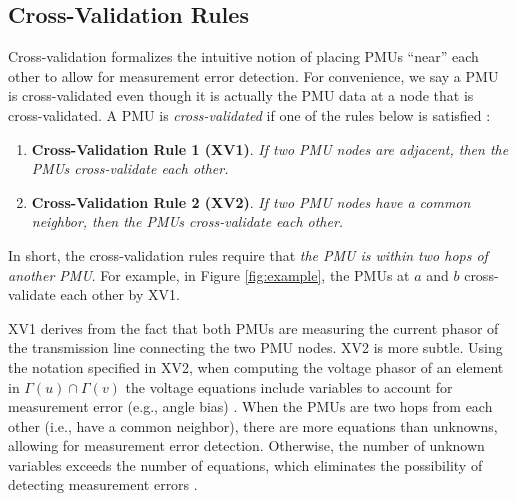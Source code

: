 \subsection{Cross-Validation Rules}
\label{subsec:xval-rules}

Cross-validation formalizes the intuitive notion of placing PMUs ``near'' each other to allow for measurement error detection. 
For convenience, we say a PMU is cross-validated even though it is actually the PMU data at a node that is cross-validated.
A PMU is \emph{cross-validated} if one of the rules below is satisfied \cite{Vanfretti10}: 
\begin{enumerate}
	
	\item {\bf Cross-Validation Rule 1 (XV1)}.  {\it If two PMU nodes are adjacent, then the PMUs cross-validate each other. }

	\item {\bf Cross-Validation Rule 2 (XV2)}. {\it If two PMU nodes have a common neighbor, then the PMUs cross-validate each other.}
\end{enumerate}
In short, the cross-validation rules require that {\em the PMU is within two hops of another PMU}.
For example, in Figure \ref{fig:example}, the PMUs at $a$ and $b$ cross-validate each other by XV1.

XV1 derives from the fact that both PMUs are measuring the current phasor of the transmission line connecting the two PMU nodes.  XV2 is more subtle.  
Using the notation specified in XV2, when computing the voltage phasor of an element in $\Gamma(u)\cap\Gamma(v)$ the voltage equations include variables to 
account for measurement error (e.g., angle bias) \cite{Vanfretti-thesis}. 
When the PMUs are two hops from each other (i.e., have a common neighbor), there are more equations than unknowns, allowing for measurement error detection. 
Otherwise, the number of unknown variables exceeds the number of equations, which eliminates the possibility of detecting measurement errors \cite{Vanfretti-thesis}.





